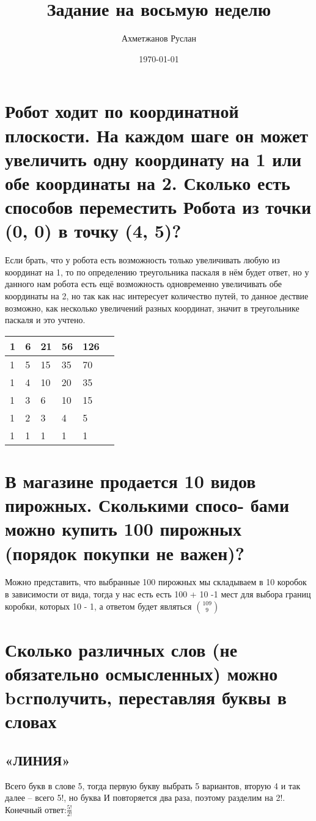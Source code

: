 \documentclass[a4paper,11pt]{article}
\author{Ахметжанов Руслан}
\title{Задание на восьмую неделю}
\date{\today}
\begin{document}
\maketitle 


\section{Робот ходит по координатной плоскости. На каждом шаге он
может увеличить одну координату на 1 или обе координаты на 2.
Сколько есть способов переместить Робота из точки (0, 0) в точку
(4, 5)?}
 Если брать, что у робота есть возможность только увеличивать любую из координат на 1, то по определению треугольника паскаля в нём будет ответ, но у данного нам робота есть ещё возможность одновременно увеличивать обе координаты на 2, но так как нас интересует количество путей, то данное дествие возможно, как несколько увеличений разных координат, значит в треугольнике паскаля и это учтено.
\begin{tabular}{ | l | l | l | l | l | l |}
\hline
1 & 6 & 21 & 56 & \textbf{126}\\ \hline
1 & 5 & 15 & 35 & 70\\ \hline
1 & 4 & 10 & 20 & 35 \\ \hline
1 & 3 & 6 & 10 & 15\\ \hline
1 & 2 & 3 & 4 & 5\\ \hline
1 & 1 & 1 & 1 & 1\\ \hline
\end{tabular}

\section{В магазине продается 10 видов пирожных. Сколькими спосо-
бами можно купить 100 пирожных (порядок покупки не важен)?}
 Можно представить, что выбранные 100 пирожных мы складываем в 10 коробок в зависимости от вида, тогда у нас есть есть 100 + 10 -1 мест для выбора границ коробки, которых 10 - 1, а ответом будет являться \textbf{${109 \choose 9}$}

\section{Сколько различных слов (не обязательно осмысленных) можно
bcrполучить, переставляя буквы в словах}

\subsection{«ЛИНИЯ»}
 Всего букв в слове 5, тогда первую букву выбрать 5 вариантов, вторую 4 и так далее -- всего 5!, но буква И повторяется два раза,   поэтому разделим на 2!. Конечный ответ:$\frac{5!}{2!}$	
\end{document}
